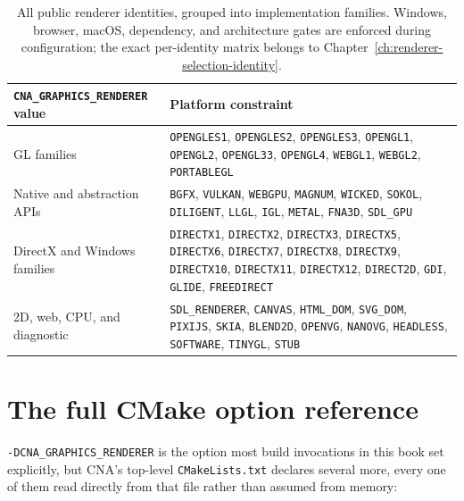 \begin{table}[h]
\centering
\begin{tabularx}{\textwidth}{lX}
\toprule
\textbf{\texttt{CNA\_GRAPHICS\_RENDERER} value} & \textbf{Platform constraint} \\
\midrule
GL families & \texttt{OPENGLES1}, \texttt{OPENGLES2}, \texttt{OPENGLES3},
  \texttt{OPENGL1}, \texttt{OPENGL2}, \texttt{OPENGL33}, \texttt{OPENGL4},
  \texttt{WEBGL1}, \texttt{WEBGL2}, \texttt{PORTABLEGL} \\
Native and abstraction APIs & \texttt{BGFX}, \texttt{VULKAN}, \texttt{WEBGPU},
  \texttt{MAGNUM}, \texttt{WICKED}, \texttt{SOKOL}, \texttt{DILIGENT},
  \texttt{LLGL}, \texttt{IGL}, \texttt{METAL}, \texttt{FNA3D}, \texttt{SDL\_GPU} \\
DirectX and Windows families & \texttt{DIRECTX1}, \texttt{DIRECTX2},
  \texttt{DIRECTX3}, \texttt{DIRECTX5}, \texttt{DIRECTX6}, \texttt{DIRECTX7},
  \texttt{DIRECTX8}, \texttt{DIRECTX9}, \texttt{DIRECTX10}, \texttt{DIRECTX11},
  \texttt{DIRECTX12}, \texttt{DIRECT2D}, \texttt{GDI}, \texttt{GLIDE},
  \texttt{FREEDIRECT} \\
2D, web, CPU, and diagnostic & \texttt{SDL\_RENDERER}, \texttt{CANVAS},
  \texttt{HTML\_DOM}, \texttt{SVG\_DOM}, \texttt{PIXIJS}, \texttt{SKIA},
  \texttt{BLEND2D}, \texttt{OPENVG}, \texttt{NANOVG}, \texttt{HEADLESS},
  \texttt{SOFTWARE}, \texttt{TINYGL}, \texttt{STUB} \\
\bottomrule
\end{tabularx}
\caption{All \RendererIdentityCount{} public renderer identities, grouped into
\RendererFamilyCount{} implementation families. Windows,
browser, macOS, dependency, and architecture gates are enforced during configuration; the exact
per-identity matrix belongs to Chapter~\ref{ch:renderer-selection-identity}.}
\label{tab:backend-option-list}
\end{table}

\section{The full CMake option reference}
\label{sec:cmake-option-reference}

\texttt{-DCNA\_GRAPHICS\_RENDERER} is the option most build invocations in this book set
explicitly, but CNA's top-level \texttt{CMakeLists.txt} declares several more, every one of
them read directly from that file rather than assumed from memory:


